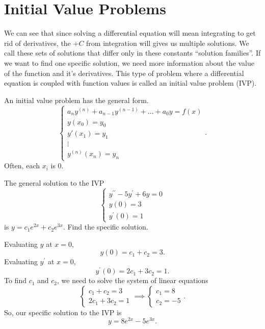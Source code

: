 \section{Initial Value Problems}
\noindent
We can see that since solving a differential equation will mean integrating to get rid of derivatives, the $+ C$ from integration will gives us multiple solutions. We call these sets of solutions that differ only in these constants ``solution families''. If we want to find one specific solution, we need more information about the value of the function and it's derivatives. This type of problem where a differential equation is coupled with function values is called an initial value problem (IVP).\\

\begin{definition}
	An initial value problem has the general form.
	\begin{equation*}
		\begin{cases}
			a_ny^{(n)} + a_{n-1}y^{(n-1)} + \ldots + a_0y = f(x) \\
			y(x_0) = y_0 \\
			y'(x_1) = y_1 \\
			\vdots \\
			y^{(n)}(x_n) = y_n
		\end{cases}.
	\end{equation*}
	Often, each $x_i$ is 0.
\end{definition}


\begin{example}
	The general solution to the IVP
	\begin{equation*}
		\begin{cases}
			y^{\prime\prime} - 5y^\prime + 6y = 0 \\
			y(0) = 3 \\
			y^\prime(0) = 1
		\end{cases}
	\end{equation*}
	is $y = c_1e^{2x} + c_2e^{3x}$. Find the specific solution.
\end{example}
\noindent
Evaluating $y$ at $x = 0$,
\begin{equation*}
	y(0) = c_1 + c_2 = 3.
\end{equation*}
Evaluating $y^\prime$ at $x = 0$,
\begin{equation*}
	y^\prime(0) = 2c_1 + 3c_2 = 1.
\end{equation*}
To find $c_1$ and $c_2$, we need to solve the system of linear equations
\begin{equation*}
	\begin{cases}
		c_1 + c_2 = 3 \\
		2c_1 + 3c_2 = 1
	\end{cases} \implies \begin{cases}
		c_1 = 8 \\
		c_2 = -5
	\end{cases}.
\end{equation*}
So, our specific solution to the IVP is
\begin{equation*}
	y = 8e^{2x} - 5e^{3x}.
\end{equation*}

